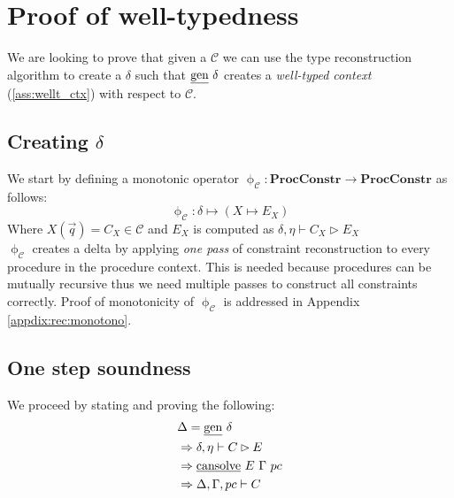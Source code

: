 \documentclass[12pt,a4paper,twoside]{book}
\begin{document}
\section{Proof of well-typedness}
We are looking to prove that given a $\mathscr{C}$ we can use the type reconstruction algorithm to create a $\delta$ such that $\text{\underline{gen}} ~\delta$ creates a \emph{well-typed context} (\ref{ass:wellt_ctx}) with respect to $\mathscr{C}$.

\subsection{Creating $\delta$}
We start by defining a monotonic operator $\upphi_\mathscr{C}: \textbf{ProcConstr} \rightarrow \textbf{ProcConstr}$ as follows:
$$
\upphi_\mathscr{C}: \delta \mapsto (X \mapsto E_X)
$$
Where $X(\vec{q}) = C_X \in \mathscr{C}$ and $E_X$ is computed as $\delta, \eta\vdash C_X \rhd E_X$\\
$\upphi_\mathscr{C}$ creates a delta by applying \emph{one pass} of constraint reconstruction to every procedure in the procedure context. This is needed because procedures can be mutually recursive thus we need multiple passes to construct all constraints correctly. Proof of monotonicity of $\upphi_\mathscr{C}$ is addressed in Appendix \ref{appdix:rec:monotono}.
\subsection{One step soundness}
We proceed by stating and proving the following:
\begin{align}
\begin{split}\label{rec:one_step}
&\Delta = \text{\underline{gen}}~\delta\\
&\Rightarrow \delta, \eta \vdash C \rhd E\\
&\Rightarrow \text{\underline{cansolve}}~E~\Gamma~pc\\
&\Rightarrow \Delta, \Gamma, pc \vdash C
\end{split}
\end{align}
\end{document}
